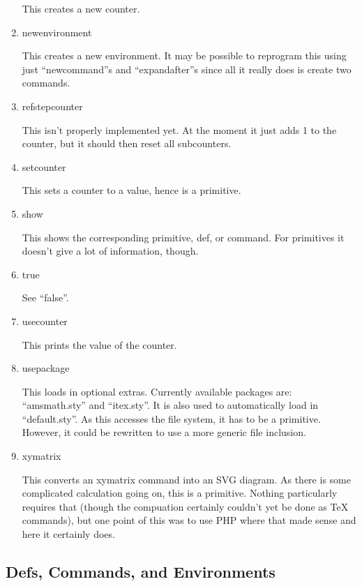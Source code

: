 \documentclass{webpage}
\begin{document}
\begin{enumerate}
This creates a new counter.

\item newenvironment

This creates a new environment.
It may be possible to reprogram this using just ``newcommand''s and ``expandafter''s since all it really does is create two commands.

\item refstepcounter

This isn't properly implemented yet.
At the moment it just adds 1 to the counter, but it should then reset all subcounters.

\item setcounter

This sets a counter to a value, hence is a primitive.

\item show

This shows the corresponding primitive, def, or command.
For primitives it doesn't give a lot of information, though.

\item true

See ``false''.

\item usecounter

This prints the value of the counter.

\item usepackage

This loads in optional extras.
Currently available packages are: ``amsmath.sty'' and ``itex.sty''.
It is also used to automatically load in ``default.sty''.
As this accesses the file system, it has to be a primitive.
However, it could be rewritten to use a more generic file inclusion.

\item xymatrix

This converts an xymatrix command into an SVG diagram.
As there is some complicated calculation going on, this is a primitive.
Nothing particularly requires that (though the compuation certainly couldn't yet be done as TeX commands), but one point of this was to use PHP where that made sense and here it certainly does.
\end{enumerate}

\subsection{Defs, Commands, and Environments}
\end{document}
